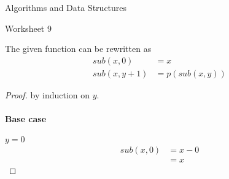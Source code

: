 \documentclass{article}
\begin{document}
    {Algorithms and Data Structures}

    \begin{center} \LARGE Worksheet 9 \end{center}
    \begin{tasks}
        \item {
            The given function can be rewritten as
            \begin{displaymath}
                \begin{aligned}
                    sub(x, 0) &= x \\
                    sub(x, y+1) &= p(sub(x, y))
                \end{aligned}
            \end{displaymath}
            \begin{proof}
                by induction on \(y\).
                
                \paragraph{Base case} \(y = 0\)
                \begin{displaymath}
                    \begin{aligned}
                        sub(x, 0) 
                        &= x - 0 \\
                        &= x
                    \end{aligned}
                \end{displaymath}
                

\end{proof}}
\end{tasks}
\end{document}
